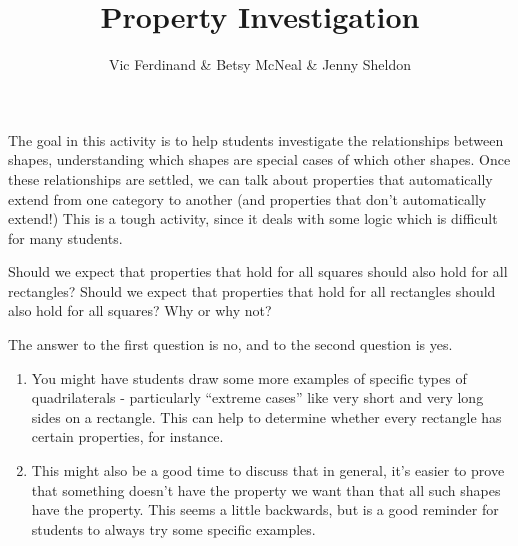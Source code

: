 \documentclass[handout]{ximera}
\title{Property Investigation}
\author{Vic Ferdinand \& Betsy McNeal \& Jenny Sheldon}
\begin{document}
\begin{abstract}\end{abstract}
\maketitle

\begin{instructorIntro}
The goal in this activity is to help students investigate the relationships between shapes, understanding which shapes are special cases of which other shapes.  Once these relationships are settled, we can talk about properties that automatically extend from one category to another (and properties that don't automatically extend!)  This is a tough activity, since it deals with some logic which is difficult for many students.
\end{instructorIntro}

\begin{problem} Should we expect that properties that hold for all squares should also hold for all rectangles?  Should we expect that properties that hold for all rectangles should also hold for all squares?  Why or why not? 

\begin{solution}
The answer to the first question is no, and to the second question is yes.
\end{solution}

\begin{instructorNotes}
\begin{enumerate}
\item You might have students draw some more examples of specific types of quadrilaterals - particularly ``extreme cases'' like very short and very long sides on a rectangle.  This can help to determine whether every rectangle has certain properties, for instance.
\item This might also be a good time to discuss that in general, it's easier to prove that something doesn't have the property we want than that all such shapes have the property.  This seems a little backwards, but is a good reminder for students to always try some specific examples.
\end{enumerate}
\end{instructorNotes}
\end{problem}
\end{document}
